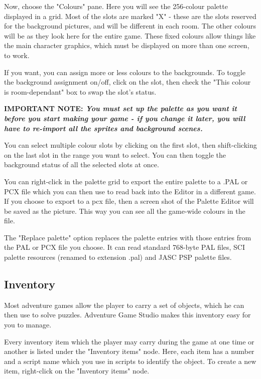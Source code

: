 Now, choose the "Colours" pane. Here you will see the 256-colour
palette displayed in a grid. Most of the slots are marked "X" - these are the
slots reserved for the background pictures, and will be different in each
room. The other colours will be as they look here for the entire game. These
fixed colours allow things like the main character graphics, which must be
displayed on more than one screen, to work.

If you want, you can assign more or less colours to the backgrounds. To toggle
the background assignment on/off, click on the slot, then check the
"This colour is room-dependant" box to swap the slot's status.

\bf{IMPORTANT NOTE:} \it{You must set up the palette as you want it before you start
making your game - if you change it later, you will have to re-import all the
sprites and background scenes.}

You can select multiple colour slots by clicking on the first slot, then
shift-clicking on the last slot in the range you want to select. You can then
toggle the background status of all the selected slots at once.

You can right-click in the palette grid to export the entire palette to
a .PAL or PCX file which you can then use to read back into the Editor in
a different game.
If you choose to export to a pcx file, then a screen shot of the Palette Editor will
be saved as the picture. This way you can see all the game-wide colours in
the file.

The "Replace palette" option replaces the palette entries with those
entries from the PAL or PCX file you choose. It can read standard 768-byte
PAL files, SCI palette resources (renamed to extension .pal) and JASC PSP
palette files.

\subsection{Inventory}%

Most adventure games allow the player to carry a set of objects, which he can
then use to solve puzzles. Adventure Game Studio makes this inventory easy
for you to manage.

Every inventory item which the player may carry during the game at one time
or another is listed under the "Inventory items" node. Here, each item
has a number and a script name which you use in scripts to identify the object.
To create a new item, right-click on the "Inventory items" node.

